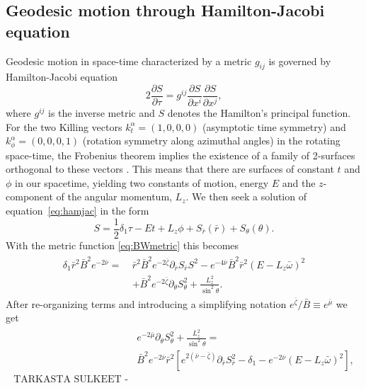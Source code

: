 \documentclass[iop, usenatbib]{emulateapj}
\newcommand{\be}{\begin{equation}}
\newcommand{\ee}{\end{equation}}
\newcommand{\pd}{\ensuremath{\partial}} %
\newcommand{\rb}{\ensuremath{\bar{r}}}
\newcommand{\wb}{\ensuremath{\bar{\omega}}}
\newcommand{\nub}{\ensuremath{\bar{\nu}}}
\newcommand{\zetab}{\ensuremath{\bar{\zeta}}}
\newcommand{\Bb}{\ensuremath{\bar{B}}}
\newcommand{\mub}{\ensuremath{\bar{\mu}}}
\begin{document}
\subsection{Geodesic motion through Hamilton-Jacobi equation}
Geodesic motion in space-time characterized by a metric
$g_{ij}$ is governed by Hamilton-Jacobi equation
\be\label{eq:hamjac}
2\frac{\pd S}{\pd \tau} = g^{ij} \frac{\pd S}{\pd x^i}\frac{\pd S}{\pd x^j},
\ee
where $g^{ij}$ is the inverse metric and $S$ denotes the Hamilton's principal function.
For the two Killing vectors $k_{t}^{\alpha} = (1,0,0,0)$ (asymptotic
time symmetry) and $k_{\phi}^{\alpha} = (0,0,0,1)$ (rotation symmetry
along azimuthal angles) in the rotating space-time, the Frobenius
theorem implies the existence of a family of 2-surfaces orthogonal to
these vectors \citep[see e.g][p.12]{rcs}.  This means that there are
surfaces of constant $t$ and $\phi$ in our spacetime, yielding two constants of
motion, energy $E$ and the $z$-component of the angular momentum, $L_z$.  
We then seek a solution of equation~\eqref{eq:hamjac} in the form
\be
S = \frac{1}{2}\delta_1 \tau - Et + L_z\phi + S_{\rb}(\rb) + S_{\theta}(\theta).
\ee
With the metric function \eqref{eq:BWmetric} this becomes
\begin{align}\begin{split} 
    \delta_1 \rb^2 \Bb^2 e^{-2\nub} =~& \rb^2 \Bb^2 e^{-2\zetab} \pd_{\rb}S_{\rb}S^2 - e^{-4\nub} \Bb^2 \rb^2 (E - L_z \wb)^2 \\
                                & + \Bb^2 e^{-2\zetab} \pd_{\theta}S_{\theta}^2 + \frac{L_z^2}{\sin^2\theta}.
\end{split}\end{align}
After re-organizing terms and introducing a simplifying notation
$e^{\zetab}/\Bb \equiv e^{\mub}$ we get
\begin{align}\begin{split}\label{eq:S}
& e^{-2\mub}\pd_{\theta}S_{\theta}^2 + \frac{L_z^2}{\sin^2\theta} = \\ 
& \Bb^2 e^{-2\nub}\rb^2 \left[ e^{2(\nub-\zetab)} \pd_{\rb}S_{\rb}^2
-\delta_{1} - e^{-2\nub}(E - L_z \wb)^2\right],\\
\text{TARKASTA SULKEET -Pauli}
\end{split}\end{align}
\end{document}
